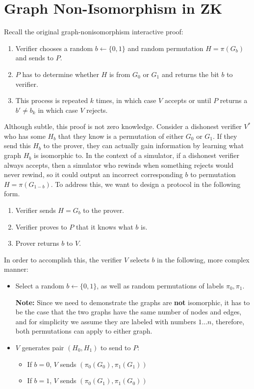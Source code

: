 \documentclass[11pt]{article}
\begin{document}
\section{Graph Non-Isomorphism in ZK}
Recall the original graph-nonisomorphism interactive proof:
\begin{enumerate}
    \item Verifier chooses a random $b \leftarrow \{0,1\}$ and random permutation $H =\pi(G_b)$ and sends to $P$.
    \item $P$ has to determine whether $H$ is from $G_0$ or $G_1$ and returns the bit $b$ to verifier.
    \item This process is repeated $k$ times, in which case $V$ accepts or until $P$ returns a $b' \neq b_k$ in which case $V$ rejects.
\end{enumerate}
Although subtle, this proof is not zero knowledge. Consider a dishonest verifier $V^*$ who has some $H_b$ that they know is a permutation of either $G_0$ or $G_1$. If they send this $H_b$ to the prover, they can actually gain information by learning what graph $H_b$ is isomorphic to. In the context of a simulator, if a dishonest verifier always accepts, then a simulator who rewinds when something rejects would never rewind, so it could output an incorrect corresponding $b$ to permutation $H = \pi(G_{1-b})$.  To address this, we want to design a protocol in the following form.
\begin{enumerate}
    \item Verifier sends $H = G_b$ to the prover.
    \item Verifier proves to $P$ that it knows what $b$ is.
    \item Prover returns $b$ to $V$.
\end{enumerate}
In order to accomplish this, the verifier $V$ selects $b$ in the following, more complex manner:
\begin{itemize}
    \item Select a random $b \leftarrow \{0,1\}$, as well as random permutations of labels $\pi_0, \pi_1$. 
    
    \textbf{Note:} Since we need to demonstrate the graphs are \textbf{not} isomorphic, it has to be the case that the two graphs have the same number of nodes and edges, and for simplicity we assume they are labeled with numbers $1...n$, therefore, both permutations can apply to either graph.

    \item $V$ generates pair $(H_0, H_1)$ to send to $P$:
    \begin{itemize}
        \item If $b=0$, $V$ sends $(\pi_0(G_0),\pi_1(G_1))$
        \item If $b=1$, $V$ sends $(\pi_0(G_1), \pi_1(G_0))$
    \end{itemize}
\end{itemize}
\end{document}
